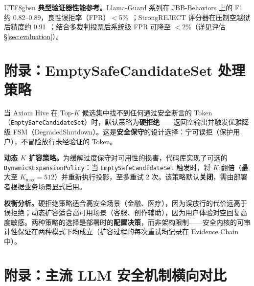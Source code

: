 \documentclass[letterpaper,twocolumn,10pt]{article}
\begin{document}
\begin{CJK}{UTF8}{gbsn}
\textbf{典型验证器性能参考。}Llama-Guard 系列在 JBB-Behaviors 上的 F1 约 0.82--0.89，良性误拒率（FPR）$<$5\%~\cite{llama-guard}；StrongREJECT 评分器在压制空越狱后精度约 0.91~\cite{strongreject}；结合多裁判投票后系统级 FPR 可降至 $<$2\%（详见评估 \S\ref{sec:evaluation}）。

\section{附录：EmptySafeCandidateSet 处理策略}
\label{sec:appendix-empty-candidate}

当 Axiom Hive 在 Top-$K$ 候选集中找不到任何通过安全断言的 Token（\texttt{EmptySafeCandidateSet}）时，默认策略为\textbf{硬拒绝}——返回空输出并触发优雅降级 FSM（DegradedShutdown）。这是\textbf{安全保守}的设计选择：宁可误拒（保护用户），不冒险放行未经验证的 Token。

\textbf{动态 $K$ 扩容策略。}为缓解过度保守对可用性的损害，代码库实现了可选的 \texttt{DynamicKExpansionPolicy}：当 \texttt{EmptySafeCandidateSet} 触发时，将 $K$ 翻倍（最大至 $K_{\max}=512$）并重新执行投影，至多重试 2 次。该策略默认\textbf{关闭}，需由部署者根据业务场景显式启用。

\textbf{权衡分析。}硬拒绝策略适合高安全场景（金融、医疗），因为误放行的代价远高于误拒绝；动态扩容适合高可用场景（客服、创作辅助），因为用户体验对空回复高度敏感。两种策略的选择是部署时的\textbf{配置决策}，而非架构限制——安全内核的可审计性保证在两种模式下均成立（扩容过程的每次重试均记录在 Evidence Chain 中）。

\section{附录：主流 LLM 安全机制横向对比}
\label{sec:appendix-comparison}


\end{CJK}
\end{document}
